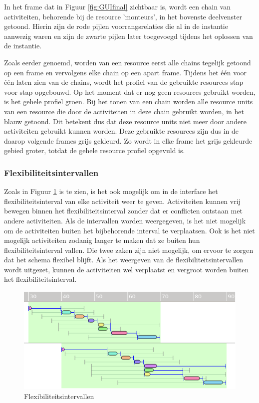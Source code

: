 In het frame dat in Figuur \ref{fig:GUIfinal} zichtbaar is, wordt een chain van activiteiten, behorende bij de resource 'monteurs', in het bovenste deelvenster getoond. Hierin zijn de rode pijlen voorrangsrelaties die al in de instantie aanwezig waren en zijn de zwarte pijlen later toegevoegd tijdens het oplossen van de instantie.

Zoals eerder genoemd, worden van een resource eerst alle chains tegelijk getoond op een frame en vervolgens elke chain op een apart frame. Tijdens het \'e\'en voor \'e\'en laten zien van de chains, wordt  het profiel van de gebruikte resources stap voor stap opgebouwd. Op het moment dat er nog geen resources gebruikt worden, is het gehele profiel groen. Bij het tonen van een chain worden alle resource units van een resource die door de activiteiten in deze chain gebruikt worden, in het blauw getoond. Dit betekent dus dat deze resource units niet meer door andere activiteiten gebruikt kunnen worden. Deze gebruikte resources zijn dus in de daarop volgende frames grijs gekleurd. Zo wordt in elke frame het grijs gekleurde gebied groter, totdat de gehele resource profiel opgevuld is.

\subsubsection{Flexibiliteitsintervallen}
Zoals in Figuur \ref{fig:flex-interval} is te zien, is het ook mogelijk om in de interface het flexibiliteitsinterval van elke activiteit weer te geven. Activiteiten kunnen vrij bewegen binnen het flexibiliteitsinterval zonder dat er conflicten ontstaan met andere activiteiten. Als de intervallen worden weergegeven, is het niet mogelijk om de activiteiten buiten het bijbehorende interval te verplaatsen. Ook is het niet mogelijk activiteiten zodanig langer te maken dat ze buiten hun flexibiliteitsinterval vallen. Die twee zaken zijn niet mogelijk, om ervoor te zorgen dat het schema flexibel blijft. Als het weergeven van de flexibiliteitsintervallen wordt uitgezet, kunnen de activiteiten wel verplaatst en vergroot worden buiten het flexibiliteitsinterval.

\begin{figure}[H]
\center
\includegraphics[width=.7\textwidth]{../images/flex-interval.png}
\caption{Flexibiliteitsintervallen}
\label{fig:flex-interval}
\end{figure}

